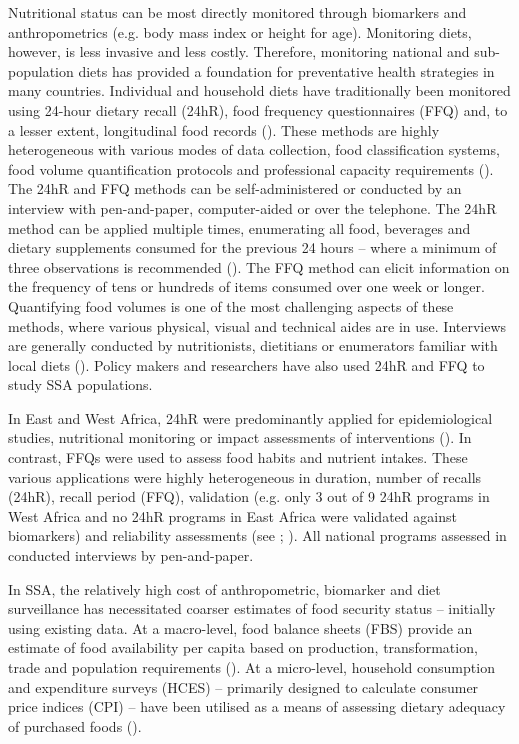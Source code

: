 Nutritional status can be most directly monitored through biomarkers and anthropometrics (e.g. body mass index or height for age). Monitoring diets, however, is less invasive and less costly. Therefore, monitoring national and sub-population diets has provided a foundation for preventative health strategies in many countries. Individual and household diets have traditionally been monitored using 24-hour dietary recall (24hR), food frequency questionnaires (FFQ) and, to a lesser extent, longitudinal food records (\citealp{Micha2018, Vila-real2018}). These methods are highly heterogeneous with various modes of data collection, food classification systems, food volume quantification protocols and professional capacity requirements (\citealp{Micha2018, Keyzer2015}). The 24hR and FFQ methods can be self-administered or conducted by an interview with pen-and-paper, computer-aided or over the telephone. The 24hR method can be applied multiple times, enumerating all food, beverages and dietary supplements consumed for the previous 24 hours -- where a minimum of three observations is recommended (\citealp{Ma2009}). The FFQ method can elicit information on the frequency of tens or hundreds of items consumed over one week or longer. Quantifying food volumes is one of the most challenging aspects of these methods, where various physical, visual and technical aides are in use. Interviews are generally conducted by nutritionists, dietitians or enumerators familiar with local diets (\citealp{Keyzer2015}). Policy makers and researchers have also used 24hR and FFQ to study SSA populations.

In East and West Africa, 24hR were predominantly applied for epidemiological studies, nutritional monitoring or impact assessments of interventions (\citealp{Pisa2017}). In contrast, FFQs were used to assess food habits and nutrient intakes. These various applications were highly heterogeneous in duration, number of recalls (24hR), recall period (FFQ), validation (e.g. only 3 out of 9 24hR programs in West Africa and no 24hR programs in East Africa were validated against biomarkers) and reliability assessments (see \citealp[p.~56]{Pisa2017}; \citealp[Tables 2 \& 3]{Vila-real2018}). All national programs assessed in \citet{Pisa2017} conducted interviews by pen-and-paper.

In SSA, the relatively high cost of anthropometric, biomarker and diet surveillance has necessitated coarser estimates of food security status -- initially using existing data. At a macro-level, food balance sheets (FBS) provide an estimate of food availability per capita based on production, transformation, trade and population requirements (\citealp{Micha2018}). At a micro-level, household consumption and expenditure surveys (HCES) -- primarily designed to calculate consumer price indices (CPI) -- have been utilised as a means of assessing dietary adequacy of purchased foods (\citealp{Micha2018, Burchi2016, Carletto2013}).

